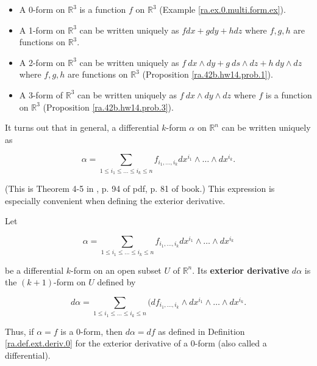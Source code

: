 \begin{itemize}

\item A 0-form on \(\mathbb{R}^3\) is a function \(f\) on \(\mathbb{R}^3\) (Example \ref{ra.ex.0.multi.form.ex}).

\item A 1-form on \(\mathbb{R}^3\) can be written uniquely as \(fdx  + gdy + h dz\) where \(f, g, h\) are functions on \(\mathbb{R}^3\).

\item A 2-form on \(\mathbb{R}^3\) can be written uniquely as \(f \ dx \wedge dy + g \ ds \wedge dz + h \ dy \wedge dz\) where \(f, g, h\) are functions on \(\mathbb{R}^3\) (Proposition \ref{ra.42b.hw14.prob.1}).

\item A 3-form of \(\mathbb{R}^3\) can be written uniquely as \(f \ dx \wedge dy \wedge dz\) where \(f\) is a function on \(\mathbb{R}^3\) (Proposition \ref{ra.42b.hw14.prob.3}).

\end{itemize}

It turns out that in general, a differential \(k\)-form \(\alpha\) on \(\mathbb{R}^n\) can be written uniquely as

\[
\alpha = \sum_{1 \leq i_1 \leq \ldots \leq i_k \leq n} f_{i_1, \ldots, i_k} dx^{i_1} \wedge \ldots \wedge dx^{i_k}.
\]

(This is Theorem 4-5 in \citet{spivak1971calculus}, p. 94 of pdf, p. 81 of book.) This expression is especially convenient when defining the exterior derivative.

\begin{definition}\label{ra.def.ext.deriv.k}

Let

\[
\alpha = \sum_{1 \leq i_1 \leq \ldots \leq i_k \leq n} f_{i_1, \ldots, i_k} dx^{i_1} \wedge \ldots \wedge dx^{i_k}
\]

be a differential \(k\)-form on an open subset \(U\) of \(\mathbb{R}^n\). Its \textbf{exterior derivative} \(d \alpha\) is the \((k+1)\)-form on \(U\) defined by 

\[
d \alpha = \sum_{1 \leq i_1 \leq \ldots \leq i_k \leq n} (df_{i_1, \ldots, i_k} \wedge dx^{i_1} \wedge \ldots \wedge dx^{i_k}.
\]

Thus, if \(\alpha = f\) is a 0-form, then \(d \alpha = df\) as defined in Definition \ref{ra.def.ext.deriv.0} for the exterior derivative of a 0-form (also called a differential).

\end{definition}

